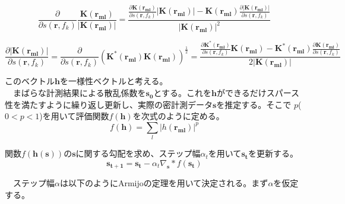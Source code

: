 \documentclass[12pt,a4paper]{jsreport}
\begin{document}
    

  \begin{equation}
    \frac{\partial}{\partial s(\bm{r},f_{k})} \frac{\bm{K({\bm{r_{ml}}})}}{|\bm{K({\bm{r_{ml}}})}|}
    = \frac{ \frac{\partial \bm{K(\bm{r_{ml}})} }{\partial s(\bm{r},f_{k})}|\bm{K({\bm{r_{ml}}})}|  - 
      \bm{K({\bm{r_{ml}}})}\frac{\partial |\bm{K(\bm{r_{ml}})}| }{\partial s(\bm{r},f_{k})}}{|\bm{K({\bm{r_{ml}}})}|^2}
        \label{正規化hの微分}
    \end{equation}

    \begin{equation}
      \frac{\partial |\bm{K({\bm{r_{ml}}})}|}{\partial s(\bm{r},f_{k})} 
      = \frac{\partial}{\partial s(\bm{r},f_{k})}(\bm{K^{*}({\bm{r_{ml}}})}\bm{K({\bm{r_{ml}}})})^{\frac{1}{2}}
      = \frac{ \frac{\partial \bm{K^{*}(\bm{r_{ml}})} }{\partial s(\bm{r},f_{k})}\bm{K({\bm{r_{ml}}})}  - 
      \bm{K^{*}({\bm{r_{ml}}})}\frac{\partial \bm{K(\bm{r_{ml}})} }{\partial s(\bm{r},f_{k})}}{2|\bm{K({\bm{r_{ml}}})}|}
          \label{絶対値kの微分}
      \end{equation}


  このベクトル$\bm{h}$を一様性ベクトルと考える。
  \\　まばらな計測結果による散乱係数を$\bm{s_{0}}$とする。これを$\bm{h}$ができるだけスパース性を満たすように繰り返し更新し、実際の密計測データ$\bm{s}$を推定する。そこで
      $p$($0<p<1$)を用いて評価関数$f(\bm{h})$を次式のように定める。
      \begin{equation}
        f(\bm{h})=\sum_{l}|h(\bm{r_{ml}})|^{p}
        \end{equation}
      
      関数$f(\bm{h({\bm{s}})})$の$\bm{s}$に関する勾配を求め、ステップ幅$\alpha_{t}$を用いて$\bm{s_{t}}$を更新する。
      \begin{equation}
        \bm{s_{t+1}}=\bm{s_{t}}-\alpha_{t}\nabla_{\bm{s}}*f(\bm{s_{t}})
        \end{equation}
      
  　ステップ幅$\alpha$は以下のようにArmijoの定理を用いて決定される。まず$\alpha$を仮定する。
\end{document}
